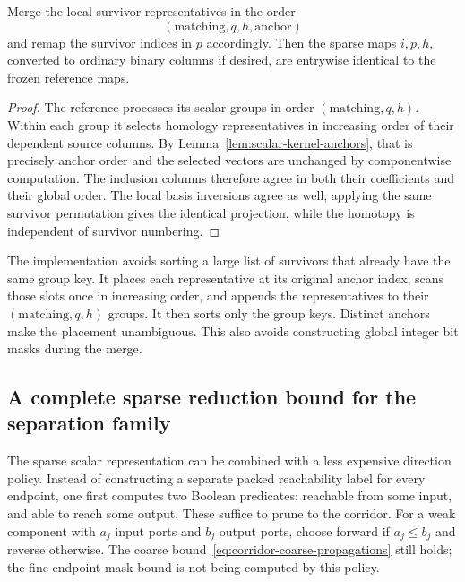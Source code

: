 \begin{corollary}
\label{cor:scalar-exact-basis}
Merge the local survivor representatives in the order
\begin{equation}\label{eq:scalar-survivor-order}
 (\text{matching},q,h,\text{anchor})
\end{equation}
and remap the survivor indices in $p$ accordingly.  Then the sparse maps
$i,p,h$, converted to ordinary binary columns if desired, are entrywise
identical to the frozen reference maps.
\end{corollary}
\begin{proof}
The reference processes its scalar groups in order $(\text{matching},q,h)$.
Within each group it selects homology representatives in increasing order
of their dependent source columns.  By Lemma~\ref{lem:scalar-kernel-anchors},
that is precisely anchor order and the selected vectors are unchanged by
componentwise computation.  The inclusion columns therefore agree in both
their coefficients and their global order.  The local basis inversions
agree as well; applying the same survivor permutation gives the identical
projection, while the homotopy is independent of survivor numbering.
\end{proof}

The implementation avoids sorting a large list of survivors that already
have the same group key.  It places each representative at its original
anchor index, scans those slots once in increasing order, and appends the
representatives to their $(\text{matching},q,h)$ groups.  It then sorts only
the group keys.  Distinct anchors make the placement unambiguous.  This
also avoids constructing global integer bit masks during the merge.

\subsection{A complete sparse reduction bound for the separation family}
\label{sec:complete-sparse-separation}

The sparse scalar representation can be combined with a less expensive
direction policy.  Instead of constructing a separate packed reachability
label for every endpoint, one first computes two Boolean predicates:
reachable from some input, and able to reach some output.  These suffice to
prune to the corridor.  For a weak component with $a_j$ input ports and $b_j$
output ports, choose forward if $a_j\le b_j$ and reverse otherwise.  The
coarse bound~\eqref{eq:corridor-coarse-propagations} still holds; the fine
endpoint-mask bound is not being computed by this policy.

